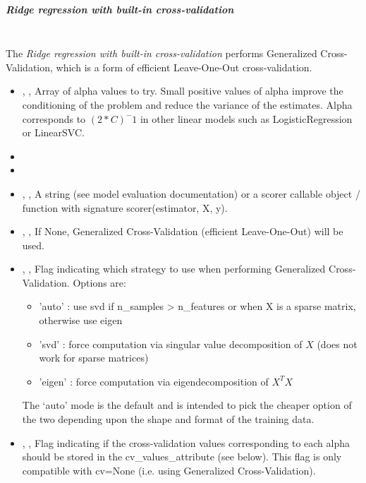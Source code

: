 \subparagraph{Ridge regression with built-in cross-validation}
\mbox{}
\\The \textit{Ridge regression with built-in cross-validation} performs
Generalized Cross-Validation, which is a form of efficient Leave-One-Out
cross-validation.
%
\begin{itemize}
  \item {} , ,
  Array of alpha values to try.
  Small positive values of alpha improve the conditioning of the problem and
  reduce the variance of the estimates.
  Alpha corresponds to $(2*C)^-1$ in other linear models such as
  LogisticRegression or LinearSVC.
  \item {}
  \item {}
  \item {} , ,
  A string (see model evaluation documentation) or a scorer callable object /
  function with signature scorer(estimator, X, y).
  \item {} , ,
  If None, Generalized Cross-Validation (efficient Leave-One-Out) will be used.
  \item {} , ,
  Flag indicating which strategy to use when performing Generalized
  Cross-Validation.
  Options are:
				\begin{itemize}
    				 \item 'auto' : use svd if n\_samples > n\_features or when X is a sparse matrix, otherwise use eigen
    				 \item 'svd' : force computation via singular value decomposition of $X$
    (does not work for sparse matrices)
    				 \item 'eigen' : force computation via eigendecomposition of $X^T X$
				 \end{itemize}
  				The ‘auto’ mode is the default and is intended to pick the cheaper
  option of the two depending upon the shape and format of the training data.
  \item {} , ,
  Flag indicating if the cross-validation values corresponding to each alpha
  should be stored in the cv\_values\_attribute (see
  below).
  This flag is only compatible with cv=None (i.e. using Generalized
  Cross-Validation).
\end{itemize}

